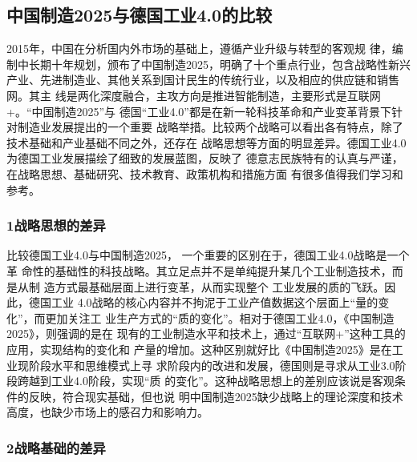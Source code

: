 \documentclass[11pt]{ctexart}
\begin{document}
{{{{\subsection{中国制造2025与德国工业4.0的比较}
\label{sec:org8105534}

2015年，中国在分析国内外市场的基础上，遵循产业升级与转型的客观规
律，编制中长期十年规划，颁布了中国制造2025，明确了十个重点行业，包含战略性新兴
产业、先进制造业、其他关系到国计民生的传统行业，以及相应的供应链和销售网。其主
线是两化深度融合，主攻方向是推进智能制造，主要形式是互联网+。“中国制造2025”与
德国“工业4.0”都是在新一轮科技革命和产业变革背景下针对制造业发展提出的一个重要
战略举措。比较两个战略可以看出各有特点，除了技术基础和产业基础不同之外，还存在
战略思想等方面的明显差异。德国工业4.0为德国工业发展描绘了细致的发展蓝图，反映了
德意志民族特有的认真与严谨，在战略思想、基础研究、技术教育、政策机构和措施方面
有很多值得我们学习和参考。

\subsubsection{1战略思想的差异}
\label{sec:org83fe059}

比较德国工业4.0与中国制造2025， 一个重要的区别在于，德国工业4.0战略是一个革
命性的基础性的科技战略。其立足点并不是单纯提升某几个工业制造技术，而是从制
造方式最基础层面上进行变革，从而实现整个 工业发展的质的飞跃。因此，德国工业
4.0战略的核心内容并不拘泥于工业产值数据这个层面上“量的变化”，而更加关注工
业生产方式的“质的变化”。相对于德国工业4.0，《中国制造2025》，则强调的是在
现有的工业制造水平和技术上，通过“互联网+”这种工具的应用，实现结构的变化和
产量的增加。这种区别就好比《中国制造2025》是在工业现阶段水平和思维模式上寻
求阶段内的改进和发展，德国则是寻求从工业3.0阶段跨越到工业4.0阶段，实现“质
的变化”。这种战略思想上的差别应该说是客观条件的反映，符合现实基础，但也说
明中国制造2025缺少战略上的理论深度和技术高度，也缺少市场上的感召力和影响力。



\subsubsection{2战略基础的差异}
\label{sec:orgf54d8d4}

}}}}
\end{document}
